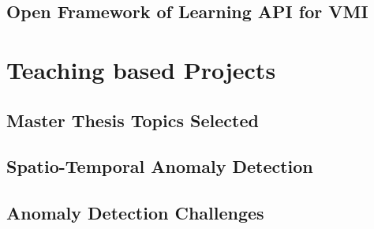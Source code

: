 \documentclass{llncs}
\begin{document}
\subsection{Open Framework of Learning API for VMI}

\section{Teaching based Projects}
\subsection{Master Thesis Topics Selected}
\subsection{Spatio-Temporal Anomaly Detection}
\subsection{Anomaly Detection Challenges}


\end{document}
